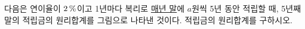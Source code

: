다음은 연이율이 $2\mkern3mu \%$이고 1년마다 복리로 \underline{매년 말}에 $a$원씩 5년 동안 적립할 때, 5년째 말의 적립금의 원리합계를 그림으로 나타낸 것이다. 적립금의 원리합계를 구하시오. 
\par\smallskip\begin{center}\resizebox{\ifdim\width>\linewidth\linewidth\else\width\fi}{!}{}\end{center}
